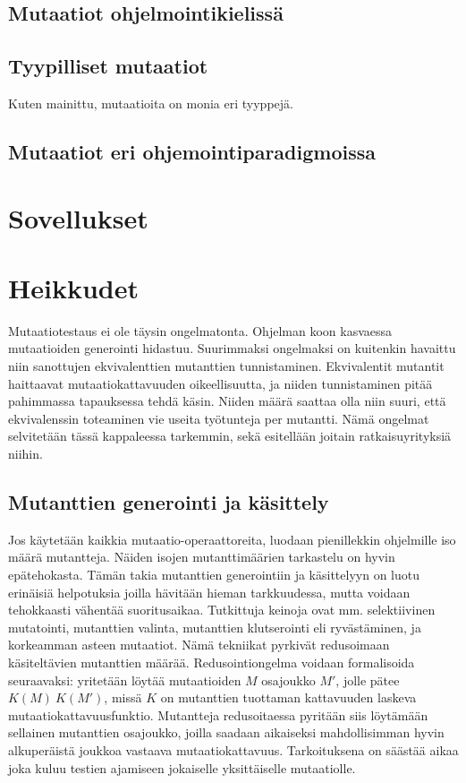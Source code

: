 \documentclass{tktltiki}
\begin{document}
\subsection{Mutaatiot ohjelmointikielissä}


\subsection{Tyypilliset mutaatiot}
Kuten mainittu, mutaatioita on monia eri tyyppejä.

\subsection{Mutaatiot eri ohjemointiparadigmoissa}

\section{Sovellukset}

\section{Heikkudet}
Mutaatiotestaus ei ole täysin ongelmatonta. Ohjelman koon kasvaessa mutaatioiden generointi hidastuu. Suurimmaksi ongelmaksi on kuitenkin havaittu niin sanottujen ekvivalenttien mutanttien tunnistaminen. Ekvivalentit mutantit haittaavat mutaatiokattavuuden oikeellisuutta, ja niiden tunnistaminen pitää pahimmassa tapauksessa tehdä käsin. Niiden määrä saattaa olla niin suuri, että ekvivalenssin toteaminen vie useita työtunteja per mutantti. Nämä ongelmat selvitetään tässä kappaleessa tarkemmin, sekä esitellään joitain ratkaisuyrityksiä niihin.

\subsection{Mutanttien generointi ja käsittely}
Jos käytetään kaikkia mutaatio-operaattoreita, luodaan pienillekkin ohjelmille iso määrä mutantteja. Näiden isojen mutanttimäärien tarkastelu on hyvin epätehokasta. Tämän takia mutanttien generointiin ja käsittelyyn on luotu erinäisiä helpotuksia joilla hävitään hieman tarkkuudessa, mutta voidaan tehokkaasti vähentää suoritusaikaa. Tutkittuja keinoja ovat mm. selektiivinen mutatointi, mutanttien valinta, mutanttien klutserointi eli ryvästäminen, ja korkeamman asteen mutaatiot. Nämä tekniikat pyrkivät redusoimaan käsiteltävien mutanttien määrää. Redusointiongelma voidaan formalisoida seuraavaksi: yritetään löytää mutaatioiden $M$ osajoukko $M'$, jolle pätee $K(M) ~ K(M')$, missä $K$ on mutanttien tuottaman kattavuuden laskeva mutaatiokattavuusfunktio. Mutantteja redusoitaessa pyritään siis löytämään sellainen mutanttien osajoukko, joilla saadaan aikaiseksi mahdollisimman hyvin alkuperäistä joukkoa vastaava mutaatiokattavuus. Tarkoituksena on säästää aikaa joka kuluu testien ajamiseen jokaiselle yksittäiselle mutaatiolle.
\end{document}
